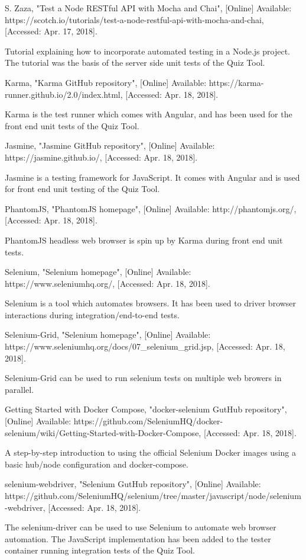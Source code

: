 \documentclass[11pt,a4paper]{report}
\begin{document}
\begin{thebibliography}{1}
 S. Zaza, "Test a Node RESTful API with Mocha and Chai", [Online] Available: https://scotch.io/tutorials/test-a-node-restful-api-with-mocha-and-chai, [Accessed: Apr. 17, 2018].

    Tutorial explaining how to incorporate automated testing in a Node.js project. The tutorial was the basis of the
    server side unit tests of the Quiz Tool.

 Karma, "Karma GitHub repository", [Online] Available: https://karma-runner.github.io/2.0/index.html, [Accessed: Apr. 18, 2018].

    Karma is the test runner which comes with Angular, and has been used for the front end unit tests of the Quiz Tool.

 Jasmine, "Jasmine GitHub repository", [Online] Available: https://jasmine.github.io/, [Accessed: Apr. 18, 2018].

    Jasmine is a testing framework for JavaScript. It comes with Angular and is used for front end unit testing of the Quiz Tool.

 PhantomJS, "PhantomJS homepage", [Online] Available: http://phantomjs.org/, [Accessed: Apr. 18, 2018].

  PhantomJS headless web browser is spin up by Karma during front end unit tests.

 Selenium, "Selenium homepage", [Online] Available: https://www.seleniumhq.org/, [Accessed: Apr. 18, 2018].

  Selenium is a tool which automates browsers. It has been used to driver browser interactions during integration/end-to-end tests.

 Selenium-Grid, "Selenium homepage", [Online] Available: https://www.seleniumhq.org/docs/07\_selenium\_grid.jsp, [Accessed: Apr. 18, 2018].

  Selenium-Grid can be used to run selenium tests on multiple web browers in parallel.

 Getting Started with Docker Compose, "docker-selenium GutHub repository", [Online] Available: https://github.com/SeleniumHQ/docker-selenium/wiki/Getting-Started-with-Docker-Compose, [Accessed: Apr. 18, 2018].

  A step-by-step introduction to using the official Selenium Docker images using a basic hub/node configuration and docker-compose.

 selenium-webdriver, "Selenium GutHub repository", [Online] Available: https://github.com/SeleniumHQ/selenium/tree/master/javascript/node/selenium-webdriver, [Accessed: Apr. 18, 2018].

  The selenium-driver can be used to use Selenium to automate web browser automation. The JavaScript implementation
  has been added to the tester container running integration tests of the Quiz Tool.




\end{thebibliography}
\end{document}
